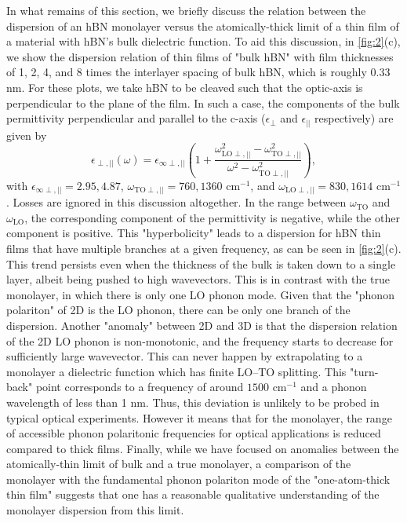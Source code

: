 \documentclass[aps,prb,twocolumn,
	           groupedaddress,superscriptaddress,
               amsfonts,amssymb,amsmath,floatfix,
	           citeautoscript]{revtex4-1}
\begin{document}
In what remains of this section, we  briefly discuss the relation between the dispersion of an hBN monolayer versus the atomically-thick limit of a thin film of a material with hBN's bulk dielectric function. To aid this discussion, in \ref{fig:2}(c), we show the dispersion relation of thin films of "bulk hBN" with film thicknesses of 1, 2, 4, and 8 times the interlayer spacing of bulk hBN, which is roughly 0.33 nm. For these plots, we take hBN to be cleaved such that the optic-axis is perpendicular to the plane of the film. In such a case, the components of the bulk permittivity perpendicular and parallel to the c-axis ($\epsilon_{\perp}$ and $\epsilon_{||}$ respectively) are given by
\begin{equation}
\epsilon_{\perp,||}(\omega) = \epsilon_{\infty\perp,||}\left(1 + \frac{\omega^2_{\mathrm{LO}\perp,||}-\omega^2_{\mathrm{TO}\perp,||}}{\omega^2-\omega^2_{\mathrm{TO}\perp,||}} \right),
\end{equation}
with $\epsilon_{\infty\perp,||} = 2.95, 4.87$, $\omega_{\mathrm{TO}\perp,||} = 760,1360$ cm$^{-1}$, and $\omega_{\mathrm{LO}\perp,||} = 830,1614$ cm$^{-1}$ \cite{caldwell2014sub,dai2014tunable}. Losses are ignored in this discussion altogether. In the range between $\omega_{\mathrm{TO}}$ and $\omega_{\mathrm{LO}}$, the corresponding component of the permittivity is negative, while the other component is positive. This "hyperbolicity" leads to a dispersion for hBN thin films that have multiple branches at a given frequency, as can be seen in \ref{fig:2}(c).  This trend persists even when the thickness of the bulk is taken down to a single layer, albeit being pushed to high wavevectors. This is in contrast with the true monolayer, in which there is only one LO phonon mode. Given that the "phonon polariton" of 2D is the LO phonon, there can be only one branch of the dispersion. Another "anomaly" between 2D and 3D is that the dispersion relation of the 2D LO phonon is non-monotonic, and the frequency starts to decrease for sufficiently large wavevector. This can never happen by extrapolating to a monolayer a dielectric function which has finite LO--TO splitting. This "turn-back" point corresponds to a frequency of around $1500$ cm$^{-1}$ and a phonon wavelength of less than 1 nm. Thus, this deviation is unlikely to be probed in typical optical experiments. However it means that for the monolayer, the range of accessible phonon polaritonic frequencies for optical applications is reduced compared to thick films. Finally, while we have focused on anomalies between the atomically-thin limit of bulk and a true monolayer, a comparison of the monolayer with the fundamental phonon polariton mode of the "one-atom-thick thin film" suggests that one has a reasonable qualitative understanding of the monolayer dispersion from this limit.
\end{document}
